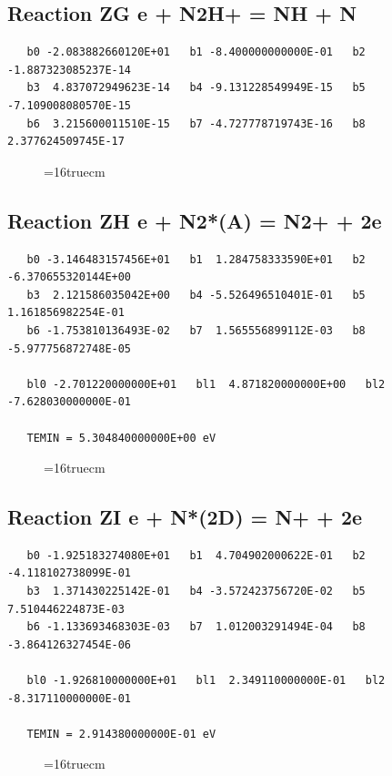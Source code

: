 \documentclass[12pt,dvipdfm]{article}
\begin{document}
\subsection{
Reaction ZG e + N2H+ = NH + N }
\begin{small}\begin{verbatim}
   b0 -2.083882660120E+01   b1 -8.400000000000E-01   b2 -1.887323085237E-14
   b3  4.837072949623E-14   b4 -9.131228549949E-15   b5 -7.109008080570E-15
   b6  3.215600011510E-15   b7 -4.727778719743E-16   b8  2.377624509745E-17
\end{verbatim}\end{small}
\begin{figure}[h!] \label{n2rates}
\epsfxsize=16truecm
\end{figure}
\newpage

\subsection{
Reaction ZH e + N2*(A) = N2+ + 2e }
\begin{small}\begin{verbatim}
   b0 -3.146483157456E+01   b1  1.284758333590E+01   b2 -6.370655320144E+00
   b3  2.121586035042E+00   b4 -5.526496510401E-01   b5  1.161856982254E-01
   b6 -1.753810136493E-02   b7  1.565556899112E-03   b8 -5.977756872748E-05

   bl0 -2.701220000000E+01   bl1  4.871820000000E+00   bl2 -7.628030000000E-01

   TEMIN = 5.304840000000E+00 eV
\end{verbatim}\end{small}
\begin{figure}[h!] \label{n2rates}
\epsfxsize=16truecm
\end{figure}
\newpage

\subsection{
Reaction ZI e + N*(2D) = N+ + 2e }
\begin{small}\begin{verbatim}
   b0 -1.925183274080E+01   b1  4.704902000622E-01   b2 -4.118102738099E-01
   b3  1.371430225142E-01   b4 -3.572423756720E-02   b5  7.510446224873E-03
   b6 -1.133693468303E-03   b7  1.012003291494E-04   b8 -3.864126327454E-06

   bl0 -1.926810000000E+01   bl1  2.349110000000E-01   bl2 -8.317110000000E-01

   TEMIN = 2.914380000000E-01 eV
\end{verbatim}\end{small}
\begin{figure}[h!] \label{n2rates}
\epsfxsize=16truecm
\end{figure}
\newpage
\end{document}
